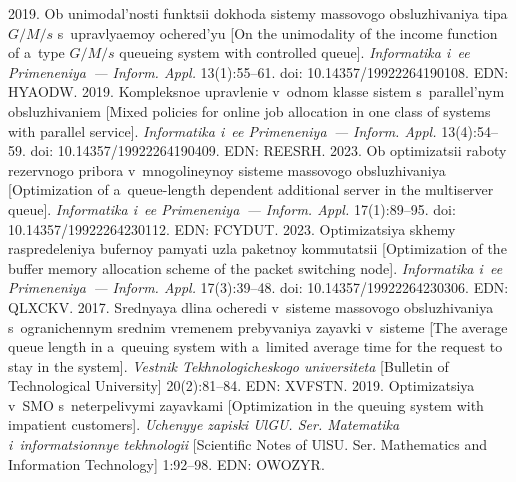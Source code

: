 \begin{multicols}{2}
{{\begin{thebibliography}{99}
 2019. Ob unimodal'nosti funktsii dokhoda sistemy massovogo 
obsluzhivaniya tipa $G/M/s$ s~upravlyaemoy ochered'yu [On the unimodality of the income function of a~type 
$G/M/s$ queueing system with controlled queue]. \textit{Informatika i~ee Primeneniya~--- Inform. Appl.} 
13(1):55--61. doi: 10.14357/19922264190108. EDN: HYAODW.
 2019. Komp\-leks\-noe upravlenie v~odnom klasse sistem 
s~parallel'nym obsluzhivaniem [Mixed policies for online job allocation in one class of systems with parallel 
service]. \textit{Informatika i~ee Primeneniya~--- Inform. Appl.} 13(4):54--59. doi: 10.14357/19922264190409. 
EDN: REESRH.
 2023. Ob optimizatsii raboty rezervnogo pribora v~mnogolineynoy sisteme 
massovogo obsluzhivaniya [Optimization of a~queue-length dependent additional server in the multiserver 
queue]. \textit{Informatika i~ee Primeneniya~--- Inform. Appl.} 17(1):89--95. doi: 10.14357/19922264230112. 
EDN: FCYDUT.
 2023. Optimizatsiya skhemy raspredeleniya bufernoy pamyati uzla paketnoy 
kommutatsii [Optimization of the buffer memory allocation scheme of the packet switching node]. 
\textit{Informatika i~ee Primeneniya~--- Inform. Appl.}  17(3):39--48. doi: 10.14357/19922264230306. EDN: 
QLXCKV.
 2017. Srednyaya dlina ocheredi v~sisteme 
massovogo obsluzhivaniya s~ogranichennym srednim vremenem prebyvaniya zayavki v~sisteme [The average 
queue length in a~queuing system with a~limited average time for the request to stay in the system]. 
\textit{Vestnik Tekhnologicheskogo universiteta} [Bulletin of  Technological University] 
20(2):81--84. EDN: XVFSTN.
 2019. Optimizatsiya v~SMO s~neterpelivymi 
zayavkami [Optimization in the queuing system with impatient customers]. \textit{Uchenyye zapiski UlGU. Ser. 
Matematika i~informatsionnye tekhnologii} [Scientific Notes of UlSU. Ser. Mathematics and Information Technology] 1:92--98. EDN: \mbox{OWOZYR}.


\end{thebibliography}}}
\end{multicols}
